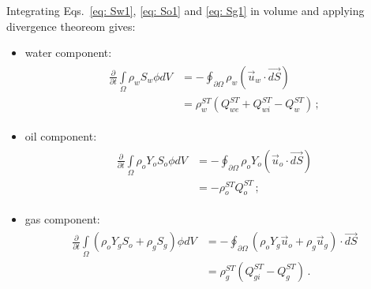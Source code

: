 \documentclass[authoryear,preprint,review,11pt]{elsarticle}
\begin{document}
Integrating Eqs.~\eqref{eq: Sw1}, \eqref{eq: So1} and \eqref{eq: Sg1} in volume and applying divergence theoreom gives:
\begin{itemize}
\item water component:
\begin{align}\label{eq: Sw2}
\begin{split}
\frac{\partial}{\partial t} \int\limits_{\Omega} \rho_w S_w \phi dV &= - \oint_{\partial \Omega} \rho_w \left( \vec{u}_w \cdot \vec{dS} \right) \\
&= \rho_w^{ST}\left(Q_{we}^{ST} + Q_{wi}^{ST}-Q_w^{ST}\right) \, ;
\end{split}
\end{align}

\item oil component:
\begin{align}\label{eq: So2}
\begin{split}
\frac{\partial}{\partial t} \int\limits_{\Omega} \rho_o Y_o S_o \phi dV &= -\oint_{\partial \Omega} \rho_o Y_o \left(\vec{u}_o \cdot \vec{dS} \right) \\
&= - \rho_o^{ST}Q_o^{ST} \, ;
\end{split}
\end{align}

\item gas component:
\begin{align}\label{eq: Sg2}
\begin{split}
\frac{\partial}{\partial t} \int\limits_{\Omega} \left( \rho_o Y_g S_o + \rho_g S_g\right) \phi dV &= - \oint_{\partial \Omega} \left( \rho_o Y_g \vec{u}_o + \rho_g \vec{u}_g\right) \cdot \vec{dS} \\
&=  \rho_g^{ST}(Q_{gi}^{ST}-Q_g^{ST}) \, .
\end{split}
\end{align}
\end{itemize}
%
%
%
%
\end{document}
